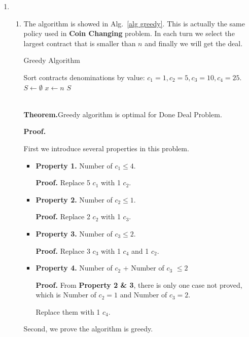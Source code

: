 \documentclass[12pt,a4paper]{article}
\makeatletter
\newtheorem*{solution}{Solution}
\theoremstyle{definition}
\renewenvironment{solution}[1][Solution] {\par\pushQED{\qed}\normalfont\topsep6\p@\@plus6\p@\relax\trivlist\item[\hskip\labelsep\bfseries#1\@addpunct{.}]\ignorespaces}{\popQED\endtrivlist\@endpefalse} \makeatother
\makeatother
\begin{document}
\begin{enumerate}
   \begin{solution}
   ~\\
   
   \begin{enumerate}
 
   \item
   The algorithm is showed in Alg.~\ref{alg greedy}. This is actually the same policy used in \textbf{Coin Changing} problem. In each turn we select the largest contract that is smaller than $n$ and finally we will get the deal.
   
   \begin{algorithm}[H]
   \caption{Greedy Algorithm}\label{alg greedy}
		Sort contracts denominations by value: $c_1=1, c_2=5, c_3=10, c_4=25$.\;
		$S\leftarrow \emptyset$\;
		$x\leftarrow n$\;
		\Return $S$\;
		
	\end{algorithm}
~\\	
\textbf{Theorem.}Greedy algorithm is optimal for Done Deal Problem.

\textbf{Proof.}

First we introduce several properties in this problem.
\begin{itemize}
\item \textbf{Property 1.} Number of $c_1\leq4$.

\textbf{Proof.} Replace 5 $c_1$ with 1 $c_2$.

\item \textbf{Property 2.} Number of $c_2\leq 1$.

\textbf{Proof.} Replace 2 $c_2$ with 1 $c_3$.

\item \textbf{Property 3.} Number of $c_3\leq2$.

\textbf{Proof.} Replace 3 $c_3$ with 1 $c_4$ and 1 $c_2$.

\item \textbf{Property 4.} Number of $c_2$ + Number of $c_3$ $\leq2$

\textbf{Proof.} From \textbf{Property 2 \& 3}, there is only one case not proved, which is Number of $c_2=1$ and Number of $c_3=2$.

Replace them with 1 $c_4$.

\end{itemize}

Second, we prove the algorithm is greedy.


\end{enumerate}
\end{solution}
\end{enumerate}
\end{document}
